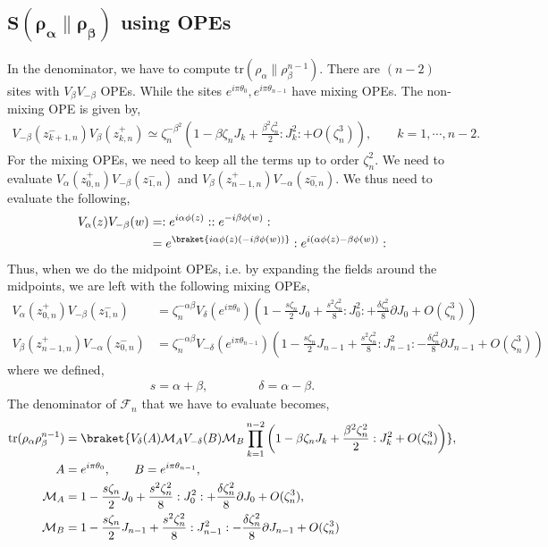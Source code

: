 \documentclass[11pt]{article}
\newcommand{\p}{\partial}
\newcommand{\lb}{\left(}
\newcommand{\rb}{\right)}
\begin{document}
\subsection{\texorpdfstring{$\boldsymbol{S(\rho_\alpha \| \rho_\beta)}$ using OPEs}{S(rho alpha rho beta) using OPEs}}
In the denominator, we have to compute $\text{tr}(\rho_\alpha\| \rho_\beta^{n-1})$. There are $(n-2)$ sites with $V_\beta V_{-\beta}$ OPEs. While the sites $e^{i\pi\theta_0}, e^{i\pi\theta_{n-1}}$ have mixing OPEs. The non-mixing OPE is given by,
\begin{align}
    V_{-\beta} (z_{k+1,n}^-)V_{\beta}(z_{k,n}^+) \simeq  \zeta_n^{-\beta^2}\lb 1- \beta \zeta_n J_k + \frac{\beta^2\zeta_n^2}{2}:J_k^2: + O(\zeta_n^3)  \rb, \qquad k = 1, \cdots, n-2.
\end{align}
For the mixing OPEs, we need to keep all the terms up to order $\zeta_n^2$. We need to evaluate $V_\alpha(z_{0,n}^+)V_{-\beta}(z_{1,n}^-)$ and $V_\beta(z_{n-1,n}^+)V_{-\alpha}(z_{0,n}^-)$. We thus need to evaluate the following,
\begin{align}
    V_\alpha(z)V_{-\beta}(w) &= :e^{i\alpha \phi(z)}::e^{-i\beta \phi(w)}: \\
    &= e^{\braket{i\alpha \phi(z) (-i\beta \phi(w))}}:e^{i(\alpha \phi(z) - \beta \phi(w))}:
\end{align}
Thus, when we do the midpoint OPEs, i.e. by expanding the fields around the midpoints, we are left with the following mixing OPEs,
\begin{align}
    V_\alpha(z_{0,n}^+)V_{-\beta}(z_{1,n}^-) &= \zeta_n^{-\alpha\beta} V_{\delta}(e^{i\pi \theta_0}) \lb 1 -\frac{ s\zeta_n}{2} J_0 + \frac{s^2\zeta_n^2}{8}:J_0^2: + \frac{\delta \zeta_n^2}{8}\p J_0 + O(\zeta_n^3)\rb \\
    V_\beta(z_{n-1,n}^+)V_{-\alpha}(z_{0,n}^-) &= \zeta_n^{-\alpha\beta} V_{-\delta}(e^{i\pi \theta_{n-1}}) \lb 1 - \frac{s\zeta_n}{2} J_{n-1} + \frac{s^2\zeta_n^2}{8}:J_{n-1}^2: - \frac{\delta \zeta_n^2}{8}\p J_{n-1} + O(\zeta_n^3)\rb
\end{align}
where we defined,
\begin{align}
    s = \alpha + \beta, \qquad \qquad \delta = \alpha-\beta.
\end{align}
The denominator of $\mathcal{F}_n$ that we have to evaluate becomes,
\begin{align}
    \text{tr}(\rho_\alpha \rho_\beta^{n-1}) &= \braket{V_\delta(A)\mathcal{M}_A V_{-\delta}(B)\mathcal{M}_B \prod_{k=1}^{n-2} \lb 1- \beta \zeta_nJ_k + \frac{\beta^2 \zeta_n^2}{2}:J^2_k + O(\zeta_n^3)\rb }, \\
     A&= e^{i\pi\theta_0}, \qquad B = e^{i\pi \theta_{n-1}}, \\
    \mathcal{M}_A &= 1 - \frac{s\zeta_n}{2} J_0 + \frac{s^2\zeta_n^2}{8}:J_0^2: + \frac{\delta \zeta_n^2}{8}\p J_0 + O(\zeta_n^3), \\
    \mathcal{M}_B &= 1 - \frac{s\zeta_n}{2} J_{n-1} + \frac{s^2\zeta_n^2}{8}:J_{n-1}^2: - \frac{\delta \zeta_n^2}{8}\p J_{n-1} + O(\zeta_n^3)
\end{align}
\end{document}
